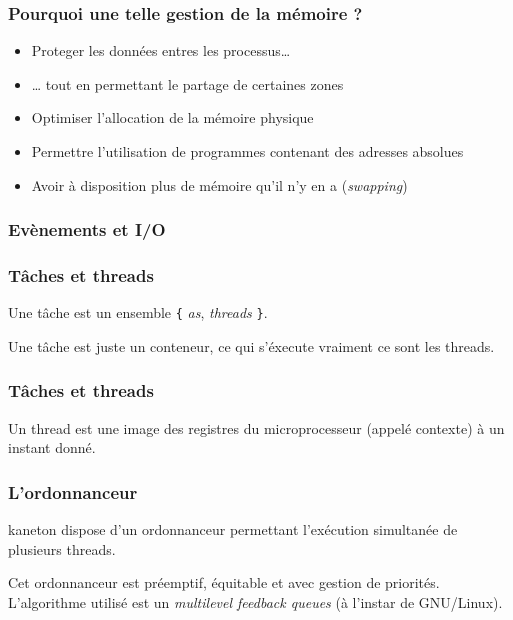
\begin{frame}
  \frametitle{Pourquoi une telle gestion de la m\'{e}moire ?}

  \begin{itemize}
  \item
    Proteger les donn\'{e}es entres les processus\ldots
  \item
    \ldots{} tout en permettant le partage de certaines zones
  \item
    Optimiser l'allocation de la m\'{e}moire physique
  \item
    Permettre l'utilisation de programmes contenant des adresses absolues
  \item
    Avoir \`{a} disposition plus de m\'{e}moire qu'il n'y en a (\emph{swapping})
  \end{itemize}

\end{frame}


\begin{frame}
  \frametitle{Ev\`{e}nements et I/O}

\end{frame}


\begin{frame}[containsverbatim]
  \frametitle{T\^{a}ches et threads}

  Une t\^{a}che est un ensemble \verb|{| \emph{as}, \emph{threads}
  \verb|}|.

  \begin{center}
  \end{center}

  Une t\^{a}che est juste un conteneur, ce qui s'\'{e}xecute vraiment
  ce sont les threads.

\end{frame}


\begin{frame}[containsverbatim]
  \frametitle{T\^{a}ches et threads}

  Un thread est une image des registres du microprocesseur (appel\'{e}
  contexte) \`{a} un instant donn\'{e}.

\end{frame}



\begin{frame}
  \frametitle{L'ordonnanceur}

  kaneton dispose d'un ordonnanceur permettant l'ex\'{e}cution
  simultan\'{e}e de plusieurs threads.

  Cet ordonnanceur est pr\'{e}emptif, \'{e}quitable et avec gestion de
  priorit\'{e}s. L'algorithme utilis\'{e} est un \emph{multilevel
  feedback queues} (\`{a} l'instar de GNU/Linux).

\end{frame}

